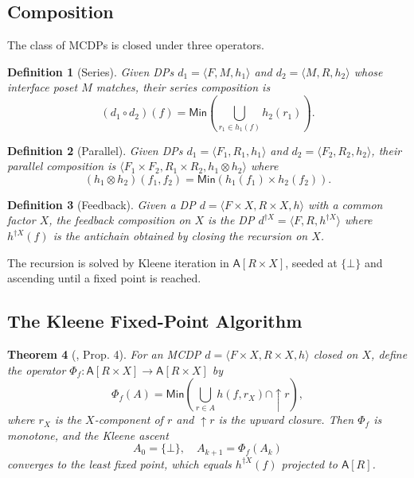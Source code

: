\documentclass[11pt,a4paper]{article}
\newtheorem{definition}{Definition}[section]
\newtheorem{theorem}[definition]{Theorem}
\newcommand{\Min}{\mathsf{Min}}
\newcommand{\Antichain}{\mathsf{A}}
\begin{document}
\subsection{Composition}

The class of MCDPs is closed under three operators.

\begin{definition}[Series]
Given DPs $d_1 = \langle F, M, h_1 \rangle$ and $d_2 = \langle M, R,
h_2 \rangle$ whose interface poset $M$ matches, their \emph{series
composition} is
\[
(d_1 \circ d_2)(f) = \Min\!\left( \bigcup_{r_1 \in h_1(f)} h_2(r_1) \right).
\]
\end{definition}

\begin{definition}[Parallel]
Given DPs $d_1 = \langle F_1, R_1, h_1 \rangle$ and $d_2 = \langle
F_2, R_2, h_2 \rangle$, their \emph{parallel composition} is
$\langle F_1 \times F_2, R_1 \times R_2, h_1 \otimes h_2 \rangle$ where
\[
(h_1 \otimes h_2)(f_1, f_2) = \Min\!\left( h_1(f_1) \times h_2(f_2) \right).
\]
\end{definition}

\begin{definition}[Feedback]
Given a DP $d = \langle F \times X, R \times X, h \rangle$ with a
common factor $X$, the \emph{feedback composition} on $X$ is the DP
$d^{\dagger X} = \langle F, R, h^{\dagger X} \rangle$ where $h^{\dagger
X}(f)$ is the antichain obtained by closing the recursion on $X$.
\end{definition}

The recursion is solved by Kleene iteration in $\Antichain[R \times
X]$, seeded at $\{\bot\}$ and ascending until a fixed point is
reached.

\subsection{The Kleene Fixed-Point Algorithm}

\begin{theorem}[\citealp{censi2015mathematical}, Prop. 4]
\label{thm:kleene}
For an MCDP $d = \langle F \times X, R \times X, h \rangle$ closed
on $X$, define the operator $\Phi_f : \Antichain[R \times X] \to
\Antichain[R \times X]$ by
\[
\Phi_f(A) = \Min\!\left( \bigcup_{r \in A} h(f, r_X) \cap \uparrow\! r \right),
\]
where $r_X$ is the $X$-component of $r$ and $\uparrow\!r$ is the
upward closure. Then $\Phi_f$ is monotone, and the Kleene ascent
\[
A_0 = \{\bot\},\quad A_{k+1} = \Phi_f(A_k)
\]
converges to the least fixed point, which equals
$h^{\dagger X}(f)$ projected to $\Antichain[R]$.
\end{theorem}
\end{document}
